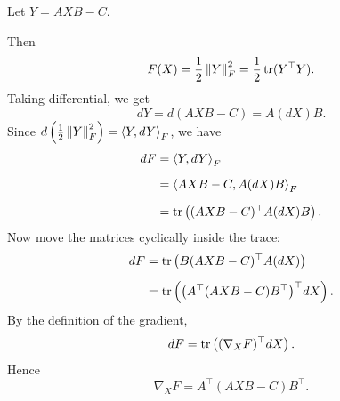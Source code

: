 \begin{pfbox}
Let $Y=AXB-C$.

Then
\[
    F(X)
    =
    \frac{1}{2}\left\lVert Y \right\rVert_F^2
    =
    \frac{1}{2}\operatorname{tr}(Y^\top Y).
\]
Taking differential, we get
\[
    dY
    =
    d(AXB-C)
    =
    A(dX)B.
\]
Since $d\left(\frac{1}{2}\left\lVert Y \right\rVert_F^2\right)=\left\langle Y, dY \right\rangle_F$, we have
\[
\begin{aligned}
    dF
    &=
    \left\langle Y, dY \right\rangle_F                                      \\[2mm]
    &=
    \left\langle AXB-C, A(dX)B \right\rangle_F                                \\[2mm]
    &=
    \operatorname{tr}\left((AXB-C)^\top A(dX)B\right).
\end{aligned}
\]
Now move the matrices cyclically inside the trace:
\[
\begin{aligned}
    dF
    &=
    \operatorname{tr}\left(B(AXB-C)^\top A(dX)\right)                           \\[2mm]
    &=
    \operatorname{tr}\left(\bigl(A^\top(AXB-C)B^\top\bigr)^\top dX\right).
\end{aligned}
\]
By the definition of the gradient,
\[
    dF
    =
    \operatorname{tr}\left((\nabla_X F)^\top dX\right).
\]
Hence
\[
    \nabla_X F
    =
    A^\top(AXB-C)B^\top.
\]
\end{pfbox}

